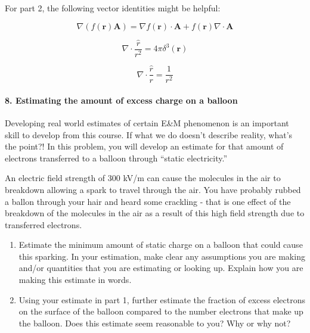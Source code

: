 \documentclass[11pt]{article}
\def\tightlist{}
\begin{document}
For part 2, the following vector identities might be helpful:

\[\nabla \left(f(\mathbf{r}) \mathbf{A}\right) = \nabla f(\mathbf{r}) \cdot \mathbf{A} + f(\mathbf{r}) \nabla \cdot \mathbf{A}\]

\[\nabla \cdot \dfrac{\hat{r}}{r^2} = 4\pi\delta^3(\mathbf{r})\]

\[\nabla \cdot \dfrac{\hat{r}}{r} = \dfrac{1}{r^2}\]

\paragraph{8. Estimating the amount of excess charge on a
balloon}\label{estimating-the-amount-of-excess-charge-on-a-balloon}

Developing real world estimates of certain E\&M phenomenon is an
important skill to develop from this course. If what we do doesn't
describe reality, what's the point?! In this problem, you will develop
an estimate for that amount of electrons transferred to a balloon
through ``static electricity.''

An electric field strength of 300 kV/m can cause the molecules in the
air to breakdown allowing a spark to travel through the air. You have
probably rubbed a ballon through your hair and heard some crackling -
that is one effect of the breakdown of the molecules in the air as a
result of this high field strength due to transferred electrons.

\begin{enumerate}
\def\labelenumi{\arabic{enumi}.}
\tightlist
\item
  Estimate the minimum amount of static charge on a balloon that could
  cause this sparking. In your estimation, make clear any assumptions
  you are making and/or quantities that you are estimating or looking
  up. Explain how you are making this estimate in words.
\item
  Using your estimate in part 1, further estimate the fraction of excess
  electrons on the surface of the balloon compared to the number
  electrons that make up the balloon. Does this estimate seem reasonable
  to you? Why or why not?
\end{enumerate}
\end{document}
